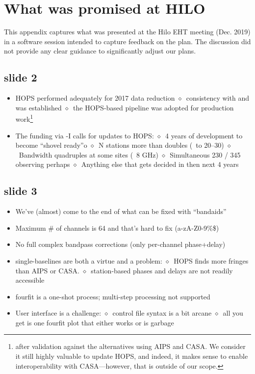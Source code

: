 %
%
\section{What was promised at HILO}
\label{sec:hilo}

This appendix captures what was presented at the Hilo
\acs{EHT} meeting (Dec. 2019) in a software session intended to
capture feedback on the plan.  The discussion
did not provide any clear guidance to significantly adjust our plans.

\newcommand{\sbitem}{\hfill\break\hspace{2mm}$\diamond$\ }

\subsection{slide 2}
\begin{itemize}
\item \ac{HOPS} performed adequately for 2017 data reduction
\sbitem consistency with  and  was established
\sbitem the \ac{HOPS}-based pipeline was adopted for production
work\footnote{%
after validation against the alternatives using \ac{AIPS} and \ac{CASA}.
We consider it still highly valuable to update \ac{HOPS}, and indeed, it
makes sense to enable interoperability with \ac{CASA}---however, that is
outside of our scope.}
\item The  funding via -I calls for updates to HOPS:
\sbitem 4 years of development to become “shovel ready”o
\sbitem N stations more than doubles (\eg~to 20--30)
\sbitem Bandwidth quadruples at some sites (\eg~8 GHz)
\sbitem Simultaneous 230 / 345  observing perhaps
\sbitem Anything else that gets decided in then next 4 years
\end{itemize}

\subsection{slide 3}
\begin{itemize}
\item We’ve (almost) come to the end of what can be fixed with “bandaids”
\item Maximum \# of channels is 64 and that’s hard to fix (a-zA-Z0-9\%\$)
\item No full complex bandpass corrections (only per-channel phase+delay)
\item single-baselines are both a virtue and a problem:
\sbitem \ac{HOPS} finds more fringes than \ac{AIPS} or \ac{CASA}.
\sbitem station-based phases and delays are not readily accessible
\item \ac{fourfit} is a one-shot process; multi-step processing not supported
\item User interface is a challenge:
\sbitem control file syntax is a bit arcane
\sbitem all you get is one \ac{fourfit} plot that either works or is garbage
\end{itemize}

